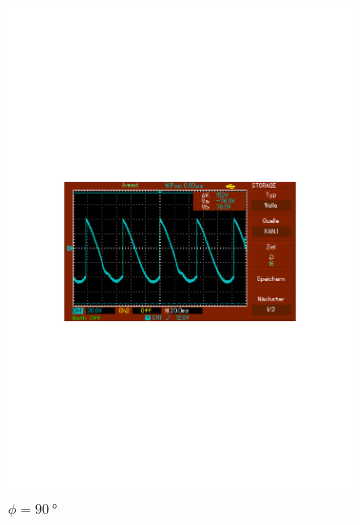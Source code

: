 \begin{figure}
\begin{subfigure}{0.3\textwidth}
      \includegraphics[width=\textwidth]{Daten/noNoise/90.pdf}
      \caption{$\phi = \SI{90}{\degree}$}
      \label{fig:90}
  \end{subfigure}
  \begin{subfigure}{0.3\textwidth}
      \centering

\end{subfigure}
\end{figure}
